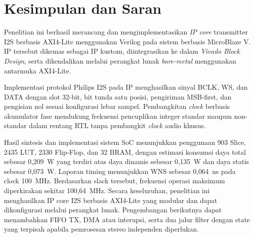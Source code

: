 \chapter{Kesimpulan dan Saran}

Penelitian ini berhasil merancang dan mengimplementasikan \textit{IP core} transmitter I2S berbasis AXI4-Lite menggunakan Verilog pada sistem berbasis MicroBlaze V. IP tersebut dikemas sebagai IP kustom, diintegrasikan ke dalam \textit{Vivado Block Design}, serta dikendalikan melalui perangkat lunak \textit{bare-metal} menggunakan antarmuka AXI4-Lite.

Implementasi protokol Philips I2S pada IP menghasilkan sinyal BCLK, WS, dan DATA dengan slot 32-bit, bit tunda satu posisi, pengiriman MSB-first, dan pengisian nol sesuai konfigurasi lebar sampel. Pembangkitan \textit{clock} berbasis akumulator fase mendukung frekuensi pencuplikan integer standar maupun non-standar dalam rentang RTL tanpa pembangkit \textit{clock} audio khusus.

Hasil sintesis dan implementasi sistem SoC menunjukkan penggunaan 903 Slice, 2435 LUT, 2330 Flip-Flop, dan 32 BRAM, dengan estimasi konsumsi daya total sebesar 0,209~W yang terdiri atas daya dinamis sebesar 0,135~W dan daya statis sebesar 0,073~W. Laporan timing menunjukkan WNS sebesar 0,064~ns pada clock 100~MHz. Berdasarkan slack tersebut, frekuensi operasi maksimum diperkirakan sekitar 100,64~MHz.
Secara keseluruhan, penelitian ini menghasilkan IP core I2S berbasis AXI4-Lite yang modular dan dapat dikonfigurasi melalui perangkat lunak. Pengembangan berikutnya dapat menambahkan FIFO TX, DMA atau interupsi, serta dua jalur filter dengan state yang terpisah apabila pemrosesan stereo independen diperlukan.
